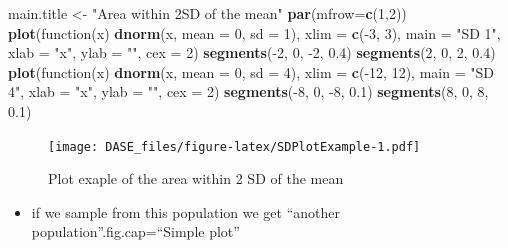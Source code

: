 \documentclass[]{book}
\newenvironment{Shaded}{\begin{snugshade}}{\end{snugshade}}
\newcommand{\KeywordTok}[1]{\textcolor[rgb]{0.13,0.29,0.53}{\textbf{{#1}}}}
\newcommand{\DataTypeTok}[1]{\textcolor[rgb]{0.13,0.29,0.53}{{#1}}}
\newcommand{\DecValTok}[1]{\textcolor[rgb]{0.00,0.00,0.81}{{#1}}}
\newcommand{\FloatTok}[1]{\textcolor[rgb]{0.00,0.00,0.81}{{#1}}}
\newcommand{\StringTok}[1]{\textcolor[rgb]{0.31,0.60,0.02}{{#1}}}
\newcommand{\NormalTok}[1]{{#1}}
\providecommand{\tightlist}{%
  \setlength{\itemsep}{0pt}\setlength{\parskip}{0pt}}
\begin{document}
\begin{Shaded}
\begin{Highlighting}[]
\NormalTok{main.title <-}\StringTok{ "Area within 2SD of the mean"}
\KeywordTok{par}\NormalTok{(}\DataTypeTok{mfrow=}\KeywordTok{c}\NormalTok{(}\DecValTok{1}\NormalTok{,}\DecValTok{2}\NormalTok{))}
\KeywordTok{plot}\NormalTok{(function(x) }\KeywordTok{dnorm}\NormalTok{(x, }\DataTypeTok{mean =} \DecValTok{0}\NormalTok{, }\DataTypeTok{sd =} \DecValTok{1}\NormalTok{),}
\DataTypeTok{xlim =} \KeywordTok{c}\NormalTok{(-}\DecValTok{3}\NormalTok{, }\DecValTok{3}\NormalTok{), }\DataTypeTok{main =} \StringTok{"SD 1"}\NormalTok{, }\DataTypeTok{xlab =} \StringTok{"x"}\NormalTok{,}
\DataTypeTok{ylab =} \StringTok{""}\NormalTok{, }\DataTypeTok{cex =} \DecValTok{2}\NormalTok{)}
\KeywordTok{segments}\NormalTok{(-}\DecValTok{2}\NormalTok{, }\DecValTok{0}\NormalTok{, -}\DecValTok{2}\NormalTok{, }\FloatTok{0.4}\NormalTok{)}
\KeywordTok{segments}\NormalTok{(}\DecValTok{2}\NormalTok{, }\DecValTok{0}\NormalTok{, }\DecValTok{2}\NormalTok{, }\FloatTok{0.4}\NormalTok{)}
\KeywordTok{plot}\NormalTok{(function(x) }\KeywordTok{dnorm}\NormalTok{(x, }\DataTypeTok{mean =} \DecValTok{0}\NormalTok{, }\DataTypeTok{sd =} \DecValTok{4}\NormalTok{),}
\DataTypeTok{xlim =} \KeywordTok{c}\NormalTok{(-}\DecValTok{12}\NormalTok{, }\DecValTok{12}\NormalTok{), }\DataTypeTok{main =} \StringTok{"SD 4"}\NormalTok{, }\DataTypeTok{xlab =} \StringTok{"x"}\NormalTok{,}
\DataTypeTok{ylab =} \StringTok{""}\NormalTok{, }\DataTypeTok{cex =} \DecValTok{2}\NormalTok{)}
\KeywordTok{segments}\NormalTok{(-}\DecValTok{8}\NormalTok{, }\DecValTok{0}\NormalTok{, -}\DecValTok{8}\NormalTok{, }\FloatTok{0.1}\NormalTok{)}
\KeywordTok{segments}\NormalTok{(}\DecValTok{8}\NormalTok{, }\DecValTok{0}\NormalTok{, }\DecValTok{8}\NormalTok{, }\FloatTok{0.1}\NormalTok{)}
\end{Highlighting}
\end{Shaded}

\begin{figure}[htbp]
\centering
\texttt{[image: DASE\_files/figure-latex/SDPlotExample-1.pdf]}
\caption{\label{fig:SDPlotExample}Plot exaple of the area within 2 SD of the
mean}
\end{figure}

\begin{itemize}
\tightlist
\item
  if we sample from this population we get ``another
  population''.fig.cap=``Simple plot''
\end{itemize}
\end{document}
